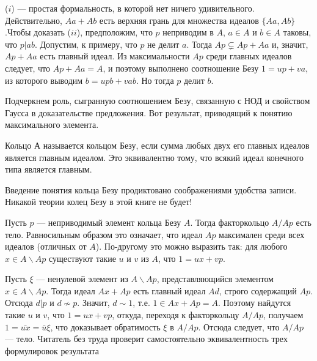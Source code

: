\begin{myproof}
($i$) — простая формальность, в которой нет ничего удивительного. Действительно, $Aa + Ab$ есть верхняя грань для множества идеалов \newline $\{Aa, Ab\}$.\newline \newline Чтобы доказать ($ii$), предположим, что $p$ неприводим в $A$, $a \in A$ и $b \in A$ таковы, что $p | ab$. Допустим, к примеру, что $p$ не делит $a$. Тогда $Ap \varsubsetneq Ap + Aa$ и, значит, $Ap + Aa$ есть главный идеал. Из максимальности $Ap$ среди главных идеалов следует, что $Ap + Aa = A$, и поэтому выполнено соотношение Безу $1 = up + va$, из которого выводим $b = upb + vab$. Но тогда $p$ делит $b$.
\end{myproof}

\indent Подчеркнем роль, сыгранную соотношением Безу, связанную с НОД и свойством Гаусса в доказательстве предложения. Вот результат, приводящий к понятию максимального элемента.


\newpage
\begin{determ}
\textit{\indent} Кольцо А называется кольцом Безу, если сумма любых двух его главных идеалов является главным идеалом. Это эквивалентно тому, что всякий идеал конечного типа является главным.
\end{determ}

\begin{mynotice}
Введение понятия кольца Безу продиктовано соображениями удобства записи. Никакой теории колец Безу в этой книге не будет!
\end{mynotice}

\begin{predl}
Пусть $p$ — неприводимый элемент кольца Безу $A$. Тогда факторкольцо $A/Ap$ есть тело. Равносильным образом это означает, что идеал $Ap$ максимален среди всех идеалов (отличных от $A$). По-другому это можно выразить так: для любого $x \in A\backslash Ap$ существуют такие $u$ и $v$ из $A$, что $1 = ux + vp$.
\end{predl}

\begin{myproof}
Пусть $\xi$ — ненулевой элемент из $A\backslash Ap$, представляющийся элементом $x \in A\backslash Ap$. Тогда идеал $Ax + Ap$ есть главный идеал $Ad$, строго содержащий $Ap$. Отсюда $d | p$ и $d \nsim p$. Значит, $d \sim 1$, т.е. $1 \in Ax + Ap = A$. Поэтому найдутся такие $u$ и $v$, что $1 = ux + vp$, откуда, переходя к факторкольцу $A/Ap$, получаем $1 = \bar{ux} = \bar{u}\xi$, что доказывает обратимость $\xi$ в $A/Ap$. Отсюда следует, что $A/Ap$ — тело. \newline Читатель без труда проверит самостоятельно эквивалентность трех формулировок результата
\end{myproof}

